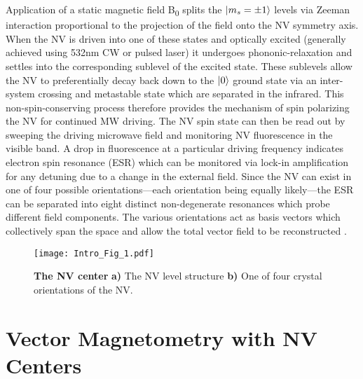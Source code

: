 Application of a static magnetic field B\textsubscript{0} splits the $\ket{m_s = \pm1}$ levels via Zeeman interaction proportional to the projection of the field onto the NV symmetry axis. When the NV is driven into one of these states and optically excited (generally achieved using 532nm CW or pulsed laser) it undergoes phononic-relaxation and settles into the corresponding sublevel of the excited state. These sublevels allow the NV to preferentially decay back down to the $\ket{0}$ ground state via an inter-system crossing and metastable state which are separated in the infrared. This non-spin-conserving process therefore provides the mechanism of spin polarizing the NV for continued MW driving. The NV spin state can then be read out by sweeping the driving microwave field and monitoring NV fluorescence in the visible band. A drop in fluorescence at a particular driving frequency indicates electron spin resonance (ESR) which can be monitored via lock-in amplification for any detuning due to a change in the external field\cite{jensen2017magnetometry,rondin2014magnetometry}. Since the NV can exist in one of four possible orientations---each orientation being equally likely---the ESR can be separated into eight distinct non-degenerate resonances which probe different field components. The various orientations act as basis vectors which collectively span the space and allow the total vector field to be reconstructed \cite{jensen2017magnetometry}. 

\begin{figure}[t!]
\centering
\texttt{[image: Intro\_Fig\_1.pdf]}  
\caption{\textbf{The NV center} \textbf{a)} The NV level structure \textbf{b)} One of four crystal orientations of the NV.}
\label{Fig_one}
\end{figure}

\section{Vector Magnetometry with NV Centers}\label{ch1:vect}

